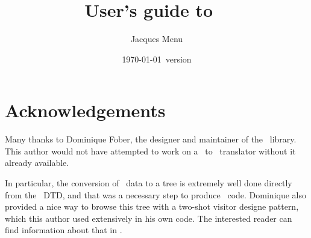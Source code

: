 \documentclass[12pt,a4paper]{article}
\begin{document}


\title{
User's guide to \xmlToLy\ \\[5pt]
}

\newsavebox{\authorBox}

\author{
Jacques Menu 
}

\date {\normalsize \today\ version}

\maketitle


\section{Acknowledgements}

Many thanks to Dominique Fober, the designer and maintainer of the \lib\ library. This author would not have attempted to work on a \mxml\ to \lily\ translator without it already available.

In particular, the conversion of \mxml\ data to a tree is extremely well done directly from the \mxml\ DTD, and that was a necessary step to produce \lily\ code. Dominique also provided a nice way to browse this tree with a two-shot visitor designe pattern, which this author used extensively in his own code. The interested reader can find information about that in .
\end{document}
